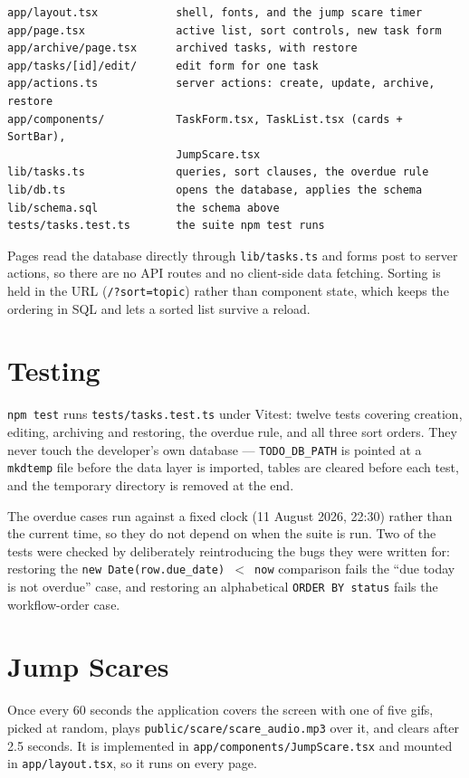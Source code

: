 \documentclass[11pt,a4paper]{article}
\begin{document}
\begin{lstlisting}
app/layout.tsx            shell, fonts, and the jump scare timer
app/page.tsx              active list, sort controls, new task form
app/archive/page.tsx      archived tasks, with restore
app/tasks/[id]/edit/      edit form for one task
app/actions.ts            server actions: create, update, archive, restore
app/components/           TaskForm.tsx, TaskList.tsx (cards + SortBar),
                          JumpScare.tsx
lib/tasks.ts              queries, sort clauses, the overdue rule
lib/db.ts                 opens the database, applies the schema
lib/schema.sql            the schema above
tests/tasks.test.ts       the suite npm test runs
\end{lstlisting}

Pages read the database directly through \texttt{lib/tasks.ts} and forms post to
server actions, so there are no API routes and no client-side data fetching.
Sorting is held in the URL (\texttt{/?sort=topic}) rather than component state,
which keeps the ordering in SQL and lets a sorted list survive a reload.

\section{Testing}

\texttt{npm test} runs \texttt{tests/tasks.test.ts} under Vitest: twelve tests
covering creation, editing, archiving and restoring, the overdue rule, and all
three sort orders. They never touch the developer's own database ---
\texttt{TODO\_DB\_PATH} is pointed at a \texttt{mkdtemp} file before the data
layer is imported, tables are cleared before each test, and the temporary
directory is removed at the end.

The overdue cases run against a fixed clock (11 August 2026, 22:30) rather than
the current time, so they do not depend on when the suite is run. Two of the
tests were checked by deliberately reintroducing the bugs they were written for:
restoring the \texttt{new Date(row.due\_date) $<$ now} comparison fails the
``due today is not overdue'' case, and restoring an alphabetical
\texttt{ORDER BY status} fails the workflow-order case.

\section{Jump Scares}

Once every 60 seconds the application covers the screen with one of five gifs,
picked at random, plays \texttt{public/scare/scare\_audio.mp3} over it, and
clears after 2.5 seconds. It is implemented in
\texttt{app/components/JumpScare.tsx} and mounted in \texttt{app/layout.tsx}, so
it runs on every page.
\end{document}
